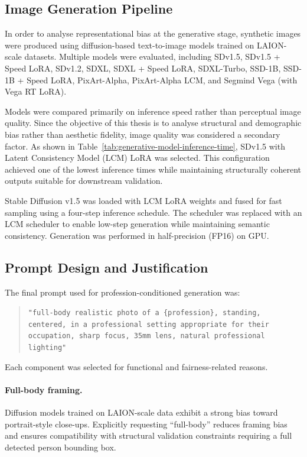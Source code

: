 \subsection{Image Generation Pipeline}

In order to analyse representational bias at the generative stage, synthetic images were produced using diffusion-based text-to-image models trained on LAION-scale datasets. Multiple models were evaluated, including SDv1.5, SDv1.5 + Speed LoRA, SDv1.2, SDXL, SDXL + Speed LoRA, SDXL-Turbo, SSD-1B, SSD-1B + Speed LoRA, PixArt-Alpha, PixArt-Alpha LCM, and Segmind Vega (with Vega RT LoRA). 

Models were compared primarily on inference speed rather than perceptual image quality. Since the objective of this thesis is to analyse structural and demographic bias rather than aesthetic fidelity, image quality was considered a secondary factor. As shown in Table~\ref{tab:generative-model-inference-time}, SDv1.5 with Latent Consistency Model (LCM) LoRA was selected. This configuration achieved one of the lowest inference times while maintaining structurally coherent outputs suitable for downstream validation.

Stable Diffusion v1.5 was loaded with LCM LoRA weights and fused for fast sampling using a four-step inference schedule. The scheduler was replaced with an LCM scheduler to enable low-step generation while maintaining semantic consistency. Generation was performed in half-precision (FP16) on GPU.

\subsection{Prompt Design and Justification}

The final prompt used for profession-conditioned generation was:

\begin{quote}
	\texttt{"full-body realistic photo of a \{profession\}, standing, centered, in a professional setting appropriate for their occupation, sharp focus, 35mm lens, natural professional lighting"}
\end{quote}

Each component was selected for functional and fairness-related reasons.

\paragraph{Full-body framing.}
Diffusion models trained on LAION-scale data exhibit a strong bias toward portrait-style close-ups. Explicitly requesting ``full-body'' reduces framing bias and ensures compatibility with structural validation constraints requiring a full detected person bounding box.

